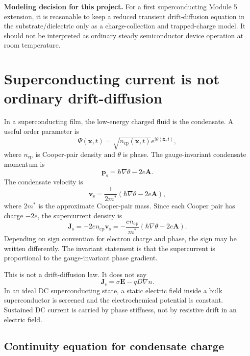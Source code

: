\documentclass[11pt]{article}
\newcommand{\Evec}{\bm{E}}
\newcommand{\Avec}{\bm{A}}
\newcommand{\x}{\bm{x}}
\newcommand{\ncp}{n_{\mathrm{cp}}}
\newcommand{\Js}{\bm{J}_{\mathrm{s}}}
\begin{document}
\begin{notebox}
\textbf{Modeling decision for this project.} For a first superconducting Module 5 extension, it is reasonable to keep a reduced transient drift-diffusion equation in the substrate/dielectric only as a charge-collection and trapped-charge model. It should not be interpreted as ordinary steady semiconductor device operation at room temperature.
\end{notebox}

\section{Superconducting current is not ordinary drift-diffusion}

In a superconducting film, the low-energy charged fluid is the condensate. A useful order parameter is
\begin{equation}
\Psi(\x,t)=\sqrt{\ncp(\x,t)}e^{i\theta(\x,t)},
\end{equation}
where \(\ncp\) is Cooper-pair density and \(\theta\) is phase. The gauge-invariant condensate momentum is
\begin{equation}
\bm{p}_{\mathrm{s}}=\hbar\nabla\theta-2e\Avec.
\end{equation}
The condensate velocity is
\begin{equation}
\bm{v}_{\mathrm{s}}=\frac{1}{2m^*}\left(\hbar\nabla\theta-2e\Avec\right),
\end{equation}
where \(2m^*\) is the approximate Cooper-pair mass. Since each Cooper pair has charge \(-2e\), the supercurrent density is
\begin{equation}
\Js = -2e\ncp\bm{v}_{\mathrm{s}}
= -\frac{e\ncp}{m^*}\left(\hbar\nabla\theta-2e\Avec\right).
\label{eq:supercurrent}
\end{equation}
Depending on sign convention for electron charge and phase, the sign may be written differently. The invariant statement is that the supercurrent is proportional to the gauge-invariant phase gradient.

This is not a drift-diffusion law. It does not say
\begin{equation}
\Js = \sigma\Evec - qD\nabla n.
\end{equation}
In an ideal DC superconducting state, a static electric field inside a bulk superconductor is screened and the electrochemical potential is constant. Sustained DC current is carried by phase stiffness, not by resistive drift in an electric field.

\subsection{Continuity equation for condensate charge}
\end{document}
